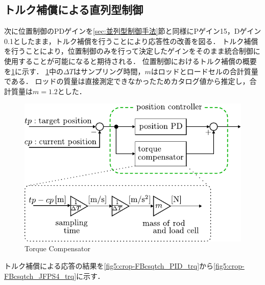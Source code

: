 \clearpage
\subsection{トルク補償による直列型制御}
次に位置制御のPDゲインを\ref{sec:並列型制御手法}節と同様にPゲイン15，Dゲイン0.1としたまま，トルク補償を行うことにより応答性の改善を図る．
トルク補償を行うことにより，位置制御のみを行って決定したゲインをそのまま統合制御に使用することが可能になると期待される．
位置制御におけるトルク補償の概要を\figname\ref{fig5:torque_compensator}に示す．
\figname\ref{fig5:torque_compensator}中の$\Delta T$はサンプリング時間，$m$はロッドとロードセルの合計質量である．
ロッドの質量は直接測定できなかったためカタログ値から推定し，合計質量は$m=1.2$とした．

\begin{figure}[t]
    \centering
        \includegraphics[keepaspectratio, scale=1.0]{contents/IntegrationControl/figure/torque_compensator.pdf}
        \caption{Torque Compensator}
        \label{fig5:torque_compensator}
\end{figure}

トルク補償による応答の結果を\figname\ref{fig5:crop-FBcsqtch_PID_trq}から\figname\ref{fig5:crop-FBcsqtch_JFPS4_trq}に示す．

